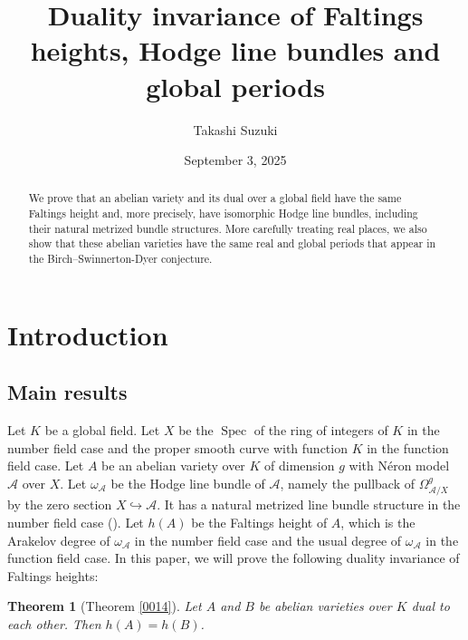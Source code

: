 \documentclass{amsart}
\title[Duality invariance of Faltings heights]
{Duality invariance of Faltings heights, Hodge line bundles and global periods}
\author{Takashi Suzuki}
\date{September 3, 2025}
\newtheorem{theorem}{Theorem}[section]
\theoremstyle{remark}
\numberwithin{equation}{section}
\newcommand{\into}{\hookrightarrow}
\DeclareMathOperator{\Spec}{Spec}
\begin{document}
\begin{abstract}
	We prove that an abelian variety and its dual over a global field
	have the same Faltings height
	and, more precisely, have isomorphic Hodge line bundles,
	including their natural metrized bundle structures.
	More carefully treating real places,
	we also show that these abelian varieties have
	the same real and global periods
	that appear in the Birch--Swinnerton-Dyer conjecture.
\end{abstract}

\maketitle

\tableofcontents


\section{Introduction}


\subsection{Main results}

Let $K$ be a global field.
Let $X$ be the $\Spec$ of the ring of integers of $K$
in the number field case
and the proper smooth curve with function $K$
in the function field case.
Let $A$ be an abelian variety over $K$ of dimension $g$
with N\'eron model $\mathcal{A}$ over $X$.
Let $\omega_{\mathcal{A}}$ be the Hodge line bundle of $\mathcal{A}$,
namely the pullback of $\Omega^{g}_{\mathcal{A} / X}$
by the zero section $X \into \mathcal{A}$.
It has a natural metrized line bundle structure
in the number field case (\cite[Section 3]{Fal86}).
Let $h(A)$ be the Faltings height of $A$,
which is the Arakelov degree of $\omega_{\mathcal{A}}$
in the number field case
and the usual degree of $\omega_{\mathcal{A}}$
in the function field case.
In this paper, we will prove the following
duality invariance of Faltings heights:

\begin{theorem}[Theorem \ref{0014}] \label{0010}
	Let $A$ and $B$ be abelian varieties over $K$
	dual to each other.
	Then $h(A) = h(B)$.
\end{theorem}
\end{document}
